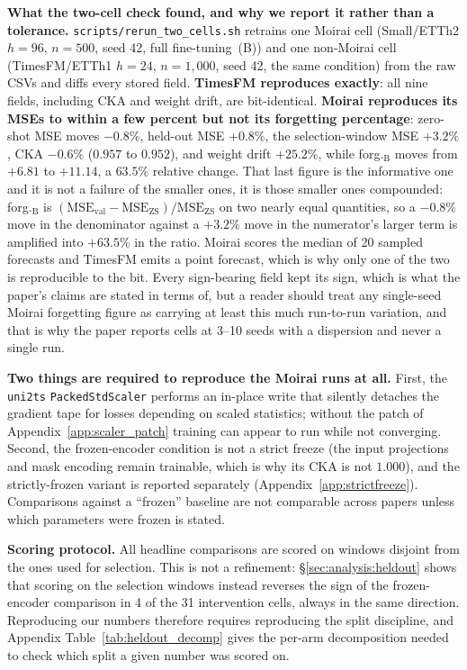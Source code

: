 \textbf{What the two-cell check found, and why we report it rather than a
tolerance.}  \texttt{scripts/rerun\_two\_cells.sh} retrains one Moirai cell
(Small/ETTh2 $h{=}96$, $n{=}500$, seed 42, full fine-tuning~(B)) and one non-Moirai
cell (TimesFM/ETTh1 $h{=}24$, $n{=}1{,}000$, seed 42, the same condition) from the raw
CSVs
and diffs every stored field.  \textbf{TimesFM reproduces exactly}: all nine
fields, including CKA and weight drift, are bit-identical.  \textbf{Moirai
reproduces its MSEs to within a few percent but not its forgetting percentage}:
zero-shot MSE moves $-0.8\%$, held-out MSE $+0.8\%$, the selection-window MSE
$+3.2\%$, CKA $-0.6\%$ ($0.957$ to $0.952$), and weight drift $+25.2\%$, while
forg.$_\text{B}$ moves from $+6.81$ to $+11.14$, a $63.5\%$ relative change.
That last figure is the informative one and it is not a failure of the smaller
ones, it is those smaller ones compounded: forg.$_\text{B}$ is
$(\text{MSE}_\text{val}-\text{MSE}_\text{ZS})/\text{MSE}_\text{ZS}$ on two nearly
equal quantities, so a $-0.8\%$ move in the denominator against a $+3.2\%$ move in
the numerator's larger term is amplified into $+63.5\%$ in the ratio.
Moirai scores the median of 20 sampled forecasts and TimesFM emits a point
forecast, which is why only one of the two is reproducible to the bit.  Every
sign-bearing field kept its sign, which is what the paper's claims are stated in
terms of, but a reader should treat any single-seed Moirai forgetting figure as
carrying at least this much run-to-run variation, and that is why the paper
reports cells at 3--10 seeds with a dispersion and never a single run.

\textbf{Two things are required to reproduce the Moirai runs at all.}  First, the
\texttt{uni2ts} \texttt{PackedStdScaler} performs an in-place write that silently
detaches the gradient tape for losses depending on scaled statistics; without the
patch of Appendix~\ref{app:scaler_patch} training can appear to run while not
converging.  Second, the frozen-encoder condition is not a strict freeze (the
input projections and mask encoding remain trainable, which is why its CKA is not
$1.000$), and the strictly-frozen variant is reported separately
(Appendix~\ref{app:strictfreeze}).  Comparisons against a ``frozen'' baseline are
not comparable across papers unless which parameters were frozen is stated.

\textbf{Scoring protocol.}  All headline comparisons are scored on windows
disjoint from the ones used for selection.  This is not a refinement:
\S\ref{sec:analysis:heldout} shows that scoring on the selection windows instead
reverses the sign of the frozen-encoder comparison in 4 of the 31 intervention
cells, always in the same direction.  Reproducing our numbers therefore requires
reproducing the split discipline, and Appendix
Table~\ref{tab:heldout_decomp} gives the per-arm decomposition needed to check
which split a given number was scored on.

